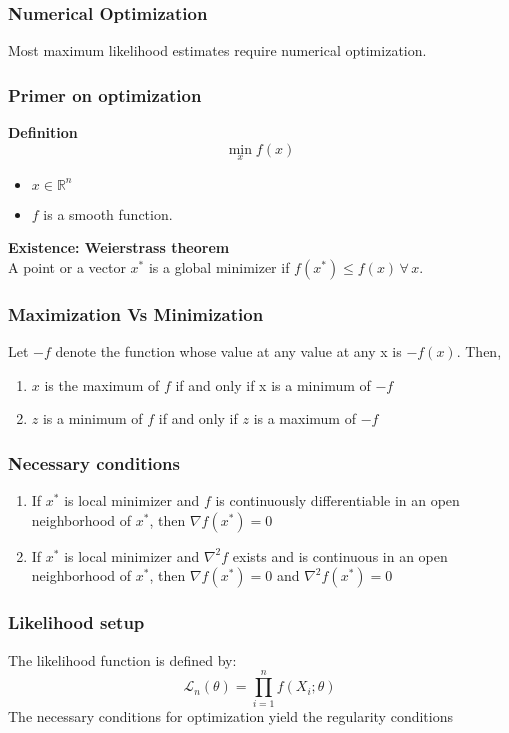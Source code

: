 \documentclass{beamer}
\newcommand{\Lik}{\mathcal{L}}
\newcommand{\1}{\mathbb{1}}
\newcommand{\Real}{\mathbb{R}}
\begin{document}
\begin{frame}
\tableofcontents[currentsection] 
\end{frame}

\begin{frame}\frametitle{Numerical Optimization}
Most maximum likelihood estimates require numerical optimization. 
\end{frame}


\begin{frame}\frametitle{Primer on optimization}
\textbf{Definition}\\
\begin{equation*}
\min_x f(x)
\end{equation*}
\begin{itemize}
\item $x \in \Real^n$
\item $f$ is a smooth function. 
\end{itemize}
\textbf{Existence: Weierstrass theorem}\\
A point or a vector $x^*$ is a global minimizer if $f(x^*) \leq f(x) \, \forall \, x$. 
\end{frame}

\begin{frame}\frametitle{Maximization Vs Minimization}
Let $-f$ denote the function whose value at any value at any x is $-f(x)$. Then,
\begin{enumerate}
\item $x$ is the maximum of $f$ if and only if x is a minimum of $-f$
\item $z$ is a minimum of $f$ if and only if $z$ is a maximum of $-f$ 
\end{enumerate}
\end{frame}

\begin{frame}\frametitle{Necessary conditions}
\begin{enumerate}
\item If $x^{*}$ is local minimizer and $f$ is continuously differentiable in an open neighborhood of $x^{*}$, then $\nabla f(x^*)=0$
\item If $x^{*}$ is local minimizer and $\nabla^2 f$ exists and is continuous in an open neighborhood of $x^{*}$, then $\nabla f(x^*)=0$ and $\nabla^2 f(x^*) = 0$
\end{enumerate}
\end{frame}

\begin{frame}\frametitle{Likelihood setup}
The likelihood function is defined by:
\begin{equation*}
\Lik_n(\theta) = \prod_{i=1}^{n} f(X_i;\theta)
\end{equation*}
The necessary conditions for optimization yield the regularity conditions
\end{frame}
\end{document}
